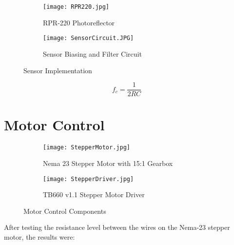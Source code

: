 \begin{figure}[h!]
	\centering
	\begin{subfigure}[t]{.315\textwidth}
		\centering
		\texttt{[image: RPR220.jpg]}
		\caption{RPR-220 Photoreflector}
		\citep{RPR:2015}
		\label{fig:rpr}
	\end{subfigure}
	\begin{subfigure}[t]{.65\textwidth}
		\centering
		\texttt{[image: SensorCircuit.JPG]}
		\caption{Sensor Biasing and Filter Circuit}
		\label{fig:sensorD}
	\end{subfigure}
	\caption{Sensor Implementation}
	\label{fig:Sensor}
\end{figure}


\begin{equation}
	f_c = \frac{1}{2 R C}
\end{equation}

\newpage


\section{Motor Control}

\begin{figure}[h!]
	\centering
	\begin{subfigure}[t]{.550\textwidth}
		\centering
		\texttt{[image: StepperMotor.jpg]}
		\caption{Nema 23 Stepper Motor with 15:1 Gearbox}
		\citep{Robotics:2022}
		\label{fig:stepper}
	\end{subfigure}
	\begin{subfigure}[t]{.41\textwidth}
		\centering
		\texttt{[image: StepperDriver.jpg]}
		\caption{TB660 v1.1 Stepper Motor Driver}
		\citep{Communica:2022}
		\label{fig:motorDriver}
	\end{subfigure}
	\caption{Motor Control Components}
	\label{fig:Motor}
\end{figure}



After testing the resistance level between the wires on the Nema-23 stepper motor, the results were:

